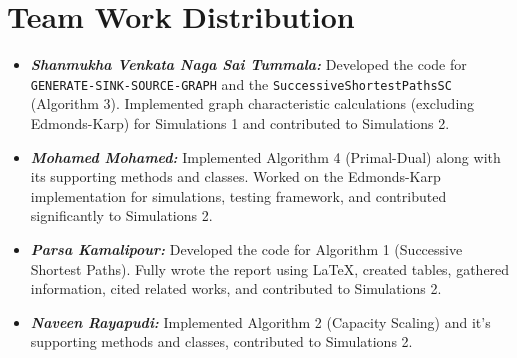 \documentclass{article}
\begin{document}
%
%

\section{Team Work Distribution}

\begin{itemize}
    \item \textbf{\textit{Shanmukha Venkata Naga Sai Tummala:}} 
    Developed the code for \texttt{GENERATE-SINK-SOURCE-GRAPH} and the \texttt{SuccessiveShortestPathsSC} (Algorithm 3). Implemented graph characteristic calculations (excluding Edmonds-Karp) for Simulations 1 and contributed to Simulations 2.
    
    \item \textbf{\textit{Mohamed Mohamed:}} 
    Implemented Algorithm 4 (Primal-Dual) along with its supporting methods and classes. Worked on the Edmonds-Karp implementation for simulations, testing framework, and contributed significantly to Simulations 2.
    
    \item \textbf{\textit{Parsa Kamalipour:}} 
    Developed the code for Algorithm 1 (Successive Shortest Paths). Fully wrote the report using LaTeX, created tables, gathered information, cited related works, and contributed to Simulations 2.
    
    \item \textbf{\textit{Naveen Rayapudi:}} 
    Implemented Algorithm 2 (Capacity Scaling) and it's supporting methods and classes, contributed to Simulations 2.
\end{itemize}
\end{document}
